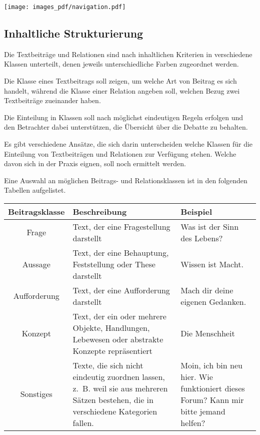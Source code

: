 \documentclass{article}
\begin{document}
	\bigskip
	\texttt{[image: images\_pdf/navigation.pdf]}
	
	\subsection{Inhaltliche Strukturierung}
	
	Die Textbeiträge und Relationen sind nach inhaltlichen Kriterien in verschiedene Klassen unterteilt, denen jeweils unterschiedliche Farben zugeordnet werden.
	
	\bigskip
	Die Klasse eines Textbeitrags soll zeigen, um welche Art von Beitrag es sich handelt, während die Klasse einer Relation angeben soll, welchen Bezug zwei Textbeiträge zueinander haben.
	
	\bigskip
	Die Einteilung in Klassen soll nach möglichst eindeutigen Regeln erfolgen und den Betrachter dabei unterstützen, die Übersicht über die Debatte zu behalten.
	
	\bigskip
	Es gibt verschiedene Ansätze, die sich darin unterscheiden welche Klassen für die Einteilung von Textbeiträgen und Relationen zur Verfügung stehen. Welche davon sich in der Praxis eignen, soll noch ermittelt werden.
	
	\bigskip
	Eine Auswahl an möglichen Beitrags- und Relationsklassen ist in den folgenden Tabellen aufgelistet.
	
	\bigskip
	\begin{tabular}{|c|p{7cm}|p{6cm}|}
		\hline
		Beitragsklasse & Beschreibung & Beispiel\\
		\hline
		\cellcolor{blue!35}Frage & Text, der eine Fragestellung darstellt & Was ist der Sinn des Lebens?\\
		\hline
		\cellcolor{green!40}Aussage & Text, der eine Behauptung, Feststellung oder These darstellt & Wissen ist Macht.\\
		\hline
		\cellcolor{orange!40}Aufforderung & Text, der eine Aufforderung darstellt & Mach dir deine eigenen Gedanken.\\
		\hline
		\cellcolor{yellow!40}Konzept & Text, der ein oder mehrere Objekte, Handlungen, Lebewesen oder abstrakte Konzepte repräsentiert & Die Menschheit\\
		\hline
		\cellcolor{gray!20}Sonstiges & Texte, die sich nicht eindeutig zuordnen lassen, z.~B. weil sie aus mehreren Sätzen bestehen, die in verschiedene Kategorien fallen.  & Moin, ich bin neu hier. Wie funktioniert dieses Forum? Kann mir bitte jemand helfen?\\
		\hline
	\end{tabular}
\end{document}
